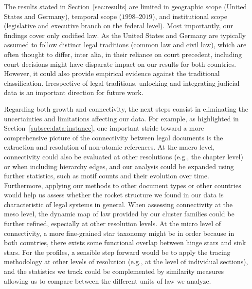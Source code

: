 The results stated in Section~\ref{sec:results} are limited in geographic scope (United States and Germany), temporal scope ($1998$--$2019$), and institutional scope (legislative and executive branch on the federal level).
Most importantly, our findings cover only codified law.
As the United States and Germany are typically assumed to follow distinct legal traditions (common law and civil law), 
which are often thought to differ, inter alia, in their reliance on court precedent, including court decisions might have disparate impact on our results for both countries.
However, it could also provide empirical evidence against the traditional classification.
Irrespective of legal traditions, unlocking and integrating judicial data is an important direction for future work.

Regarding both growth and connectivity, the next steps consist in eliminating the uncertainties and limitations affecting our data.
For example, as highlighted in Section~\ref{subsec:data:instance}, one important stride toward a more comprehensive picture of the connectivity between legal documents is the extraction and resolution of non-atomic references.
At the macro level, connectivity could also be evaluated at other resolutions (e.g., the chapter level) or when including hierarchy edges, 
and our analysis could be expanded using further statistics, such as motif counts and their evolution over time.
Furthermore, applying our methods to other document types or other countries would help us assess whether the rocket structure we found in our data is characteristic of legal systems in general.
When assessing connectivity at the meso level, the dynamic map of law provided by our cluster families could be further refined, especially at other resolution levels.
At the micro level of connectivity, a more fine-grained star taxonomy might be in order because in both countries, there exists some functional overlap between hinge stars and sink stars.
For the profiles, a sensible step forward would be to apply the tracing methodology at other levels of resolution (e.g., at the level of individual sections), and the statistics we track could be complemented by similarity measures allowing us to compare between the different units of law we analyze.

